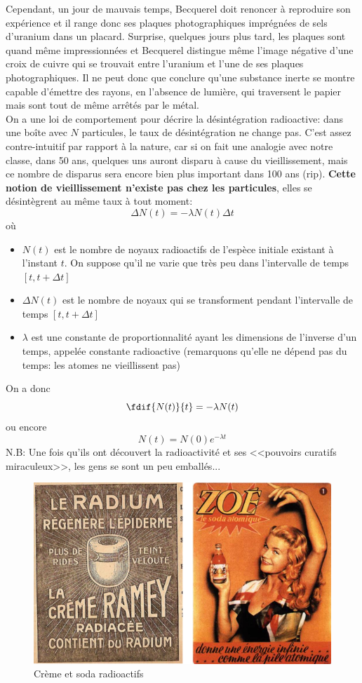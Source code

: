 Cependant, un jour de mauvais temps, Becquerel doit renoncer à reproduire son expérience et il range donc ses plaques photographiques imprégnées de sels d'uranium dans un placard. Surprise, quelques jours plus tard, les plaques sont quand même impressionnées et Becquerel distingue même l'image négative d'une croix de cuivre qui se trouvait entre l'uranium et l'une de ses plaques photographiques. Il ne peut donc que conclure qu'une substance inerte se montre capable d'émettre des rayons, en l'absence de lumière, qui traversent le papier mais sont tout de même arrêtés par le métal. \\

On a une loi de comportement pour décrire la désintégration radioactive: dans une boîte avec $N$ particules, le taux de désintégration ne change pas. C'est assez contre-intuitif par rapport à la nature, car si on fait une analogie avec notre classe, dans 50 ans, quelques uns auront disparu à cause du vieillissement, mais ce nombre de disparus sera encore bien plus important dans 100 ans (rip). \textbf{Cette notion de vieillissement n'existe pas chez les particules}, elles se désintègrent au même taux à tout moment:
\[    \Delta N(t)=-\lambda N(t) \Delta t    \]
où
\begin{itemize}
    \item $N(t)$ est le nombre de noyaux radioactifs de l'espèce initiale existant à l'instant $t$. On suppose qu'il ne varie que très peu dans l'intervalle de temps $[t,t+\Delta t]$
    \item $\Delta N(t)$ est le nombre de noyaux qui se transforment pendant l'intervalle de temps $[t,t+\Delta t]$
    \item $\lambda$ est une constante de proportionnalité ayant les dimensions de l'inverse d'un temps, appelée constante radioactive (remarquons qu'elle ne dépend pas du temps: les atomes ne vieillissent pas)
\end{itemize}
On a donc
\[
    \fdif{N(t)}{t}=-\lambda N(t)
\]
ou encore
\[
    N(t)=N(0)e^{-\lambda t}
\]
N.B: Une fois qu'ils ont découvert la radioactivité et ses <<pouvoirs curatifs miraculeux>>, les gens se sont un peu emballés...

\begin{figure}[H]
    \centering
    \includegraphics[scale=0.60]{Images1/produits.png}
    \caption{Crème et soda radioactifs}
\end{figure}

